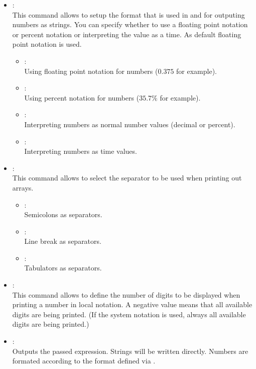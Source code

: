 \begin{itemize}

\item
{}:\\
This command allows to setup the format that is used in  and 
for outputing numbers as strings. You can specify whether to use a floating point notation or percent notation or interpreting
the value as a time. As default floating point notation is used.

\begin{itemize}
\item
{}:\\
Using floating point notation for numbers ($0.375$ for example).
\item
{}:\\
Using percent notation for numbers ($35.7\%$ for example).
\item
{}:\\
Interpreting numbers as normal number values (decimal or percent).
\item
{}:\\
Interpreting numbers as time values.
\end{itemize}

\item
{}:\\
This command allows to select the separator to be used when printing out arrays.
\begin{itemize}
\item
{}:\\
Semicolons as separators.
\item
{}:\\
Line break as separators.
\item
{}:\\
Tabulators as separators.
\end{itemize}

\item
{}:\\
This command allows to define the number of digits to be displayed when
printing a number in local notation. A negative value means that all
available digits are being printed.
(If the system notation is used, always all available digits are being printed.)

\item
{}:\\
Outputs the passed expression.
Strings will be written directly. Numbers are formated according to the format
defined via .


\end{itemize}
